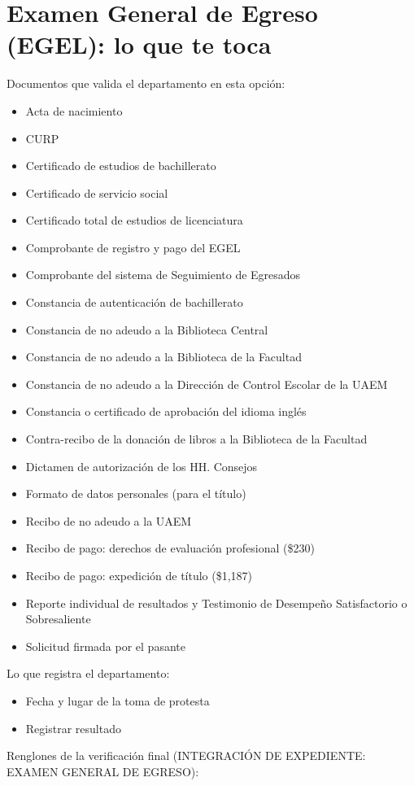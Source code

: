 \section{Examen General de Egreso (EGEL): lo que te toca}
Documentos que valida el departamento en esta opción:
\begin{itemize}
  \item Acta de nacimiento
  \item CURP
  \item Certificado de estudios de bachillerato
  \item Certificado de servicio social
  \item Certificado total de estudios de licenciatura
  \item Comprobante de registro y pago del EGEL
  \item Comprobante del sistema de Seguimiento de Egresados
  \item Constancia de autenticación de bachillerato
  \item Constancia de no adeudo a la Biblioteca Central
  \item Constancia de no adeudo a la Biblioteca de la Facultad
  \item Constancia de no adeudo a la Dirección de Control Escolar de la UAEM
  \item Constancia o certificado de aprobación del idioma inglés
  \item Contra-recibo de la donación de libros a la Biblioteca de la Facultad
  \item Dictamen de autorización de los HH. Consejos
  \item Formato de datos personales (para el título)
  \item Recibo de no adeudo a la UAEM
  \item Recibo de pago: derechos de evaluación profesional (\$230)
  \item Recibo de pago: expedición de título (\$1,187)
  \item Reporte individual de resultados y Testimonio de Desempeño Satisfactorio o Sobresaliente
  \item Solicitud firmada por el pasante
\end{itemize}
Lo que registra el departamento:
\begin{itemize}
  \item Fecha y lugar de la toma de protesta
  \item Registrar resultado
\end{itemize}
Renglones de la verificación final (INTEGRACIÓN DE EXPEDIENTE: EXAMEN GENERAL DE EGRESO):
